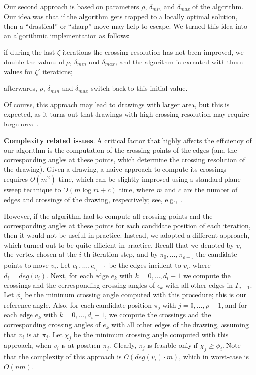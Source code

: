 \documentclass[runningheads]{llncs}
\newcommand{\myparagraph}[1]{\smallskip\noindent\textbf{#1}.}
\begin{document}
Our second approach is based on parameters $\rho$, $\delta_{min}$ and $\delta_{max}$ of the algorithm. Our idea was that if the algorithm gets trapped to a locally optimal solution, then a ``drastical'' or ``sharp'' move may help to escape. We turned this idea into an algorithmic implementation as follows: 
%
\begin{inparaenum}[(i)]
\item if during the last $\zeta$ iterations the crossing resolution has not been improved, we double the values of $\rho$, $\delta_{min}$ and $\delta_{max}$, and the algorithm is executed with these values for $\zeta'$ iterations;
\item afterwards, $\rho$, $\delta_{min}$ and $\delta_{max}$ switch back to this initial value.
\end{inparaenum}
%
Of course, this approach may lead to drawings with larger area, but this is expected, as it turns out that drawings with high crossing resolution may require large area~\cite{DBLP:journals/jgaa/AngeliniCDFBKS11,DBLP:journals/tcs/BrandenburgDEKL16}. 

\myparagraph{Complexity related issues}
%
A critical factor that highly affects the efficiency of our algorithm is the computation of the crossing points of the edges (and the corresponding angles at these points, which determine the crossing resolution of the drawing). Given  a drawing, a naive approach to compute its crossings requires $O(m^2)$ time, which can be slightly improved using a standard plane-sweep technique to $O(m \log m + c)$ time, where $m$ and $c$ are the number of edges and crossings of the drawing, respectively; see, e.g.,~\cite{DBLP:books/lib/BergCKO08}. 

However, if the algorithm had to compute all crossing points and the corresponding angles at these points for each candidate position of each iteration, then it would not be useful in practice. Instead, we adopted a different approach, which turned out to be quite efficient in practice. Recall that we denoted by $v_i$ the vertex chosen at the $i$-th iteration step, and by $\pi_0,\ldots,\pi_{\rho-1}$ the candidate points to move $v_i$. Let $e_0,\ldots,e_{d_i-1}$ be the edges incident to $v_i$, where $d_i=deg(v_i)$. Next, for each edge $e_k$ with $k=0,\ldots,d_i-1$  we compute the crossings and the corresponding crossing angles of $e_k$ with all other edges in $\Gamma_{i-1}$. Let $\phi_i$ be the minimum crossing angle computed with this procedure; this is our reference angle. Also, for each candidate position $\pi_j$ with $j=0,\ldots,\rho-1$, and for each edge $e_k$ with $k=0,\ldots,d_i-1$, we compute the crossings and the corresponding crossing angles of $e_k$ with all other edges of the drawing, assuming that $v_i$ is at $\pi_j$. Let $\chi_j$ be the minimum crossing angle computed with this approach, when $v_i$ is at position $\pi_j$. Clearly, $\pi_j$ is feasible only if $\chi_j \geq \phi_i$. Note that the complexity of this approach is $O(deg(v_i) \cdot m)$, which in worst-case is $O(nm)$. 
\end{document}
